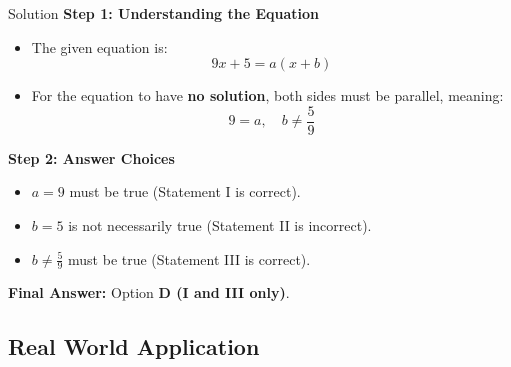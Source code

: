 \documentclass{beamer}
\begin{document}
\begin{frame}{Solution}
    \textbf{Step 1: Understanding the Equation}
    \begin{itemize}
        \item The given equation is:
        \[
        9x + 5 = a(x + b)
        \]
        \item For the equation to have \textbf{no solution}, both sides must be parallel, meaning:
        \[
        9 = a, \quad b \neq \frac{5}{9}
        \]
    \end{itemize}

    \textbf{Step 2: Answer Choices}
    \begin{itemize}
        \item \( a = 9 \) must be true (Statement I is correct).
        \item \( b = 5 \) is not necessarily true (Statement II is incorrect).
        \item \( b \neq \frac{5}{9} \) must be true (Statement III is correct).
    \end{itemize}
    
    \textbf{Final Answer:} Option \textbf{D (I and III only)}.
\end{frame}

\begin{frame}
\section{Real World Application}
\end{frame}
\end{document}

